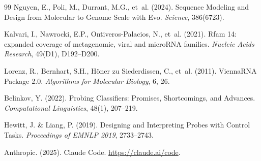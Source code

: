 \documentclass[11pt]{article}
\begin{document}
\begin{thebibliography}{99}
Nguyen, E., Poli, M., Durrant, M.G., et~al. (2024).
Sequence Modeling and Design from Molecular to Genome Scale with Evo.
\emph{Science}, 386(6723).

Kalvari, I., Nawrocki, E.P., Ontiveros-Palacios, N., et~al. (2021).
Rfam 14: expanded coverage of metagenomic, viral and microRNA families.
\emph{Nucleic Acids Research}, 49(D1), D192--D200.

Lorenz, R., Bernhart, S.H., Höner zu Siederdissen, C., et~al. (2011).
ViennaRNA Package 2.0.
\emph{Algorithms for Molecular Biology}, 6, 26.

Belinkov, Y. (2022).
Probing Classifiers: Promises, Shortcomings, and Advances.
\emph{Computational Linguistics}, 48(1), 207--219.

Hewitt, J. \& Liang, P. (2019).
Designing and Interpreting Probes with Control Tasks.
\emph{Proceedings of EMNLP 2019}, 2733--2743.

Anthropic. (2025).
Claude Code. \url{https://claude.ai/code}.

\end{thebibliography}
\end{document}
